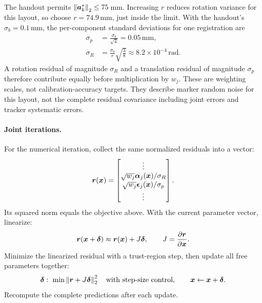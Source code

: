 \documentclass[../main.tex]{subfiles}
\begin{document}
The handout permits $\left\|\bm{a}_k^*\right\|_2\leq75$\,mm. Increasing $r$ reduces rotation variance for this layout, so choose $r=74.9$\,mm, just inside the limit. With the handout's $\sigma_b=0.1$\,mm, the per-component standard deviations for one registration are
\begin{equation*}
\begin{aligned}
\sigma_p&=\frac{\sigma_b}{\sqrt4}=0.05\,\mathrm{mm},\\
\sigma_R&=\frac{\sigma_b}{r}\sqrt{\frac38}
\approx8.2\times10^{-4}\,\mathrm{rad}.
\end{aligned}
\end{equation*}
A rotation residual of magnitude $\sigma_R$ and a translation residual of magnitude $\sigma_p$ therefore contribute equally before multiplication by $w_j$. These are weighting scales, not calibration-accuracy targets. They describe marker random noise for this layout, not the complete residual covariance including joint errors and tracker systematic errors.

\paragraph{Joint iterations.}
For the numerical iteration, collect the same normalized residuals into a vector:
\begin{equation*}
\bm{r}(\bm{x})=
\begin{bmatrix}
\vdots\\\sqrt{w_j}\bm{\alpha}_j(\bm{x})/\sigma_R\\
\sqrt{w_j}\bm{\epsilon}_j(\bm{x})/\sigma_p\\\vdots
\end{bmatrix}.
\end{equation*}
Its squared norm equals the objective above. With the current parameter vector, linearize:
\begin{equation*}
\bm{r}(\bm{x}+\bm{\delta})\approx\bm{r}(\bm{x})+J\bm{\delta},\qquad
J=\frac{\partial\bm{r}}{\partial\bm{x}}.
\end{equation*}
Minimize the linearized residual with a trust-region step, then update all free parameters together:
\begin{equation*}
\vct{\delta}:\ \min\norm{\vct{r}+J\vct{\delta}}^2
\quad\text{with step-size control},\qquad
\vct{x}\leftarrow\vct{x}+\vct{\delta}.
\end{equation*}
Recompute the complete predictions after each update.
\end{document}

